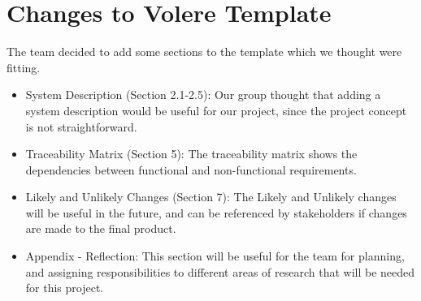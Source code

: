 \documentclass[12pt, titlepage]{article}
\begin{document}
\begin{itemize}
\end{itemize}

\section{Changes to Volere Template}
The team decided to add some sections to the template which we thought were fitting.
\begin{itemize}
    \item System Description (Section 2.1-2.5): Our group thought that adding a system description would be useful for our project, since the project concept is not straightforward.
    \item Traceability Matrix (Section 5): The traceability matrix shows the dependencies between functional and non-functional requirements.
    \item Likely and Unlikely Changes (Section 7): The Likely and Unlikely changes will be useful in the future, and can be referenced by stakeholders if changes are made to the final product.
    \item Appendix - Reflection: This section will be useful for the team for planning, and assigning responsibilities to different areas of research that will be needed for this project.
\end{itemize}

\newpage



\end{document}
